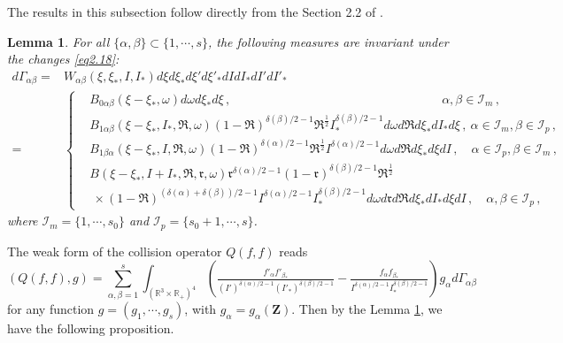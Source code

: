 \documentclass[reqno,11pt]{amsart}
\newtheorem{lemma}{Lemma}[section]
\numberwithin{equation}{section}
\def\R{\mathbb{R}}
\begin{document}
The results in this subsection follow directly from the Section 2.2 of \cite{N.Bernhoff-2023}.

  \begin{lemma}\label{measure}
	For all $\{ \alpha, \beta \} \subset \{1, \cdots , s\}$, the following measures are invariant under the changes \eqref{eq2.18}:
	\begin{equation*}
\begin{aligned}
		d\Gamma_{\alpha \beta }= & W_{\alpha \beta } (\xi, \xi_*, I, I_* ) d\xi d\xi_*d\xi'd\xi'_* dI dI_*dI'dI'_* \\
= & 
\left\{
  \begin{aligned}
    & B_{0 \alpha \beta} (\xi - \xi_*, \omega) d \omega d \xi_* d \xi \,, \qquad \qquad \qquad \qquad \qquad \qquad \qquad \qquad \quad \alpha, \beta \in \mathcal{I}_m \,, \\
    & B_{1 \alpha \beta} ( \xi - \xi_*, I_*, \mathfrak{R}, \omega ) ( 1 - \mathfrak{R} )^{ \delta (\beta) / 2 - 1 } \mathfrak{R}^\frac{1}{2} I_*^{ \delta (\beta) / 2 - 1 } d \omega d \mathfrak{R} d \xi_* d I_* d \xi \,, \ \alpha \in \mathcal{I}_m, \beta \in \mathcal{I}_p \,, \\
    & B_{1 \beta \alpha} ( \xi - \xi_*, I, \mathfrak{R}, \omega ) ( 1 - \mathfrak{R} )^{ \delta (\alpha) / 2 - 1 } \mathfrak{R}^\frac{1}{2} I^{ \delta (\alpha) / 2 - 1 } d \omega d \mathfrak{R} d \xi_* d \xi d I \,, \quad \alpha \in \mathcal{I}_p, \beta \in \mathcal{I}_m \,, \\
    & B (\xi - \xi_*, I + I_*, \mathfrak{R}, \mathfrak{r}, \omega) \mathfrak{r}^{  \delta (\alpha) / 2 - 1 } ( 1 - \mathfrak{r} )^{  \delta (\beta) / 2 - 1 } \mathfrak{R}^\frac{1}{2} \\
    & \ \times ( 1 - \mathfrak{R} )^{ ( \delta (\alpha) + \delta (\beta) ) / 2 - 1 } I^{  \delta (\alpha) / 2 - 1 } I_*^{  \delta (\beta) / 2 - 1 } d \omega d \mathfrak{r} d \mathfrak{R} d \xi_* d I_* d \xi d I \,, \quad \alpha, \beta \in \mathcal{I}_p \,,
  \end{aligned}
\right.
\end{aligned}
	\end{equation*}
where $\mathcal{I}_m = \{ 1, \cdots, s_0 \}$ and $\mathcal{I}_p = \{ s_0 + 1, \cdots, s \}$.
\end{lemma}

The weak form of the collision operator $Q(f,f)$ reads 
\begin{equation*}
(Q(f,f),g) = \sum \limits_{\alpha , \beta =1}^s \int_{(\R^3\times \R_+)^4} (\tfrac{f'_\alpha f'_{\beta_*}}{(I')^{\delta(\alpha)/2-1} (I'_* )^{\delta(\beta)/2-1}} - \tfrac{f_\alpha f_{\beta_*}}{I^{\delta(\alpha)/2-1} I_* ^{\delta(\beta)/2-1}}) g_\alpha d\Gamma_{\alpha \beta }
\end{equation*}
for any function $g= (g_1,\cdots , g_s)$, with $g_\alpha =g_\alpha (\mathbf{Z} )$. Then by the Lemma \ref{measure}, we have the following proposition.
\end{document}
